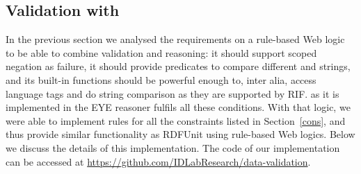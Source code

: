 \subsection{Validation with \nthreelogic}\label{n3}
In the previous section we analysed the requirements
on a rule-based Web logic to be able to combine validation and reasoning:
it should support scoped 
negation as failure, it should provide predicates to compare different \uris and strings, and its built-in functions should be powerful enough to, inter alia, 
access language tags
and do string comparison as they are supported by RIF.
\nthreelogic as it is implemented in the EYE reasoner \cite{eyepaper} fulfils all these conditions. 
With that logic, we were able to implement rules for all the constraints listed in Section~\ref{cons}, and thus 
provide similar functionality as RDFUnit using rule-based Web logics.
Below we discuss the
details of this implementation. %
The code of our implementation can be accessed at \url{https://github.com/IDLabResearch/data-validation}. 




